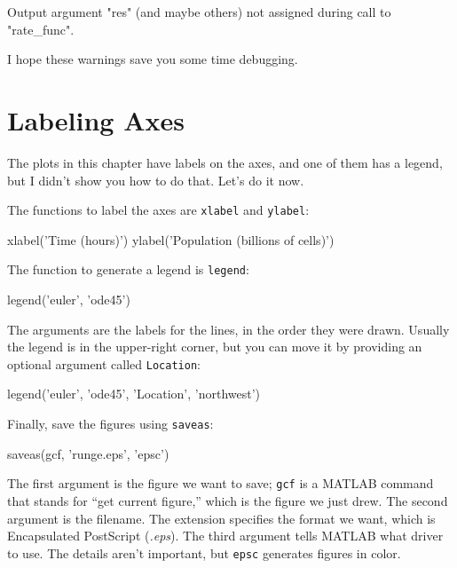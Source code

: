 \begin{code}
Output argument "res" (and maybe others) not assigned during call
to "rate_func".
\end{code}

I hope these warnings save you some time debugging.

\section{Labeling Axes}

The plots in this chapter have labels on the axes, and one of them has a legend, but I didn't show you how to do that.  Let's do it now.


The functions to label the axes are \lstinline{xlabel} and \lstinline{ylabel}:

\begin{code}
xlabel('Time (hours)')
ylabel('Population (billions of cells)')
\end{code}

The function to generate a legend is \lstinline{legend}:

\begin{code}
legend('euler', 'ode45')
\end{code}


The arguments are the labels for the lines, in the order they were drawn.  Usually the legend is in the upper-right corner, but you can move it by providing an optional argument called \lstinline{Location}:

\begin{code}
legend('euler', 'ode45', 'Location', 'northwest')
\end{code}

Finally,  save the figures using \lstinline{saveas}:

\begin{code}
saveas(gcf, 'runge.eps', 'epsc')
\end{code}

The first argument is the figure we want to save; \lstinline{gcf} is a MATLAB command that stands for ``get current figure,'' which is the figure we just drew.  The second argument is the filename.  The extension specifies the format we want, which is Encapsulated PostScript (\emph{.eps}).  The third argument tells MATLAB what driver to use.  The details aren't important, but \lstinline{epsc} generates figures in color.

